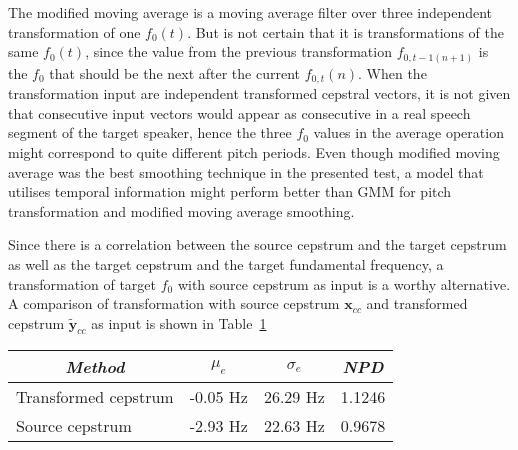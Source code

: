 The modified moving average is a moving average filter over three independent transformation of one $f_0(t)$. But is not certain that it is transformations of the same $f_0(t)$, since the value from the previous transformation $f_{0,t-1(n+1)}$ is the $f_0$ that should be the next after the current $f_{0,t}(n)$. When the transformation input are independent transformed cepstral vectors, it is not given that consecutive input vectors would appear as consecutive in a real speech segment of the target speaker, hence the three $f_0$ values in the average operation might correspond to quite different pitch periods. Even though modified moving average was the best smoothing technique in the presented test, a model that utilises temporal information might perform better than GMM for pitch transformation and modified moving average smoothing.

Since there is a correlation between the source cepstrum and the target cepstrum as well as the target cepstrum and the target fundamental frequency, a transformation of target $f_0$ with source cepstrum as input is a worthy alternative. A comparison of transformation with source cepstrum $\mathbf{x}_{cc}$ and transformed cepstrum $\mathbf{\tilde{y}}_{cc}$ as input is shown in Table~\ref{tab:f0_source_transform}
\begin{table}[htbp]
	\begin{center}
		\label{tab:f0_source_transform}
		\begin{tabular}{lrrr}
			\toprule
			\multicolumn{1}{c}{\emph{Method}} & \multicolumn{1}{c}{\emph{$\mu_e$}} & \multicolumn{1}{c}{\emph{$\sigma_e$}} & \multicolumn{1}{c}{\emph{NPD}}\\
			\midrule
			Transformed cepstrum & -0.05 Hz & 26.29 Hz & 1.1246\\
			Source cepstrum & -2.93 Hz & 22.63 Hz & 0.9678\\
			\bottomrule			
		\end{tabular}		
	\end{center}	
\end{table}

